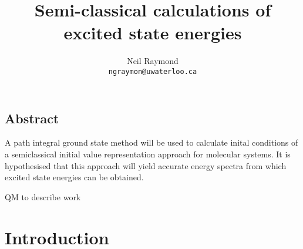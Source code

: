 \documentclass[12pt,letterpaper,oneside,final,titlepage]{article}               %
\numberwithin{equation}{section} %
\begin{document}
	\title{Semi-classical calculations of excited state energies}
	\author{Neil Raymond
	       \\ \texttt{ngraymon@uwaterloo.ca}}
    \date{}
    \maketitle

\doublespacing

\subsection*{Abstract}
A path integral ground state method will be used to calculate inital conditions of a semiclassical initial value representation approach for molecular systems. 
It is hypothesised that this approach will yield accurate energy spectra from which excited state energies can be obtained. 

QM to describe work

\section{Introduction}
\end{document}
